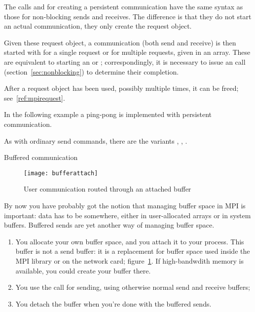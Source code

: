 The calls  and 
for creating a persistent communication have the same syntax as 
those for non-blocking sends and receives. The difference is that they do not start
an actual communication, they only create the request object.
%
%
%

Given these request object, a communication (both send and receive) is then started
with  for a single request or  for 
multiple requests, given in an array.
%
%
%
These are equivalent to starting an  or ; correspondingly, 
it is necessary to issue an  call (section~\ref{sec:nonblocking})
to determine their completion.

After a request object has been used, possibly multiple times, it can be freed; see~\ref{ref:mpirequest}.

In the following example a ping-pong is implemented with persistent communication.
%

As with ordinary send commands, there are the variants
,
,
.


 {Buffered communication}
\label{sec:buffered}

\begin{figure}[ht]
  \texttt{[image: bufferattach]}
  \caption{User communication routed through an attached buffer}
  \label{fig:bufattach}
\end{figure}

By now you have probably got the notion that managing buffer
space in MPI is important: data has to be somewhere, either in
user-allocated arrays or in system buffers. Buffered sends are yet another
way of managing buffer space.
\begin{enumerate}
\item You allocate your own buffer space, and you attach it to your
  process. This buffer is not a send buffer: it is a replacement for
  buffer space used inside the MPI library or on the network card;
  figure~\ref{fig:bufattach}. If high-bandwdith memory is available,
  you could create your buffer there.
\item You use the  call for sending, using
  otherwise normal send and receive buffers;
\item You detach the buffer when you're done with the buffered sends.
\end{enumerate}

